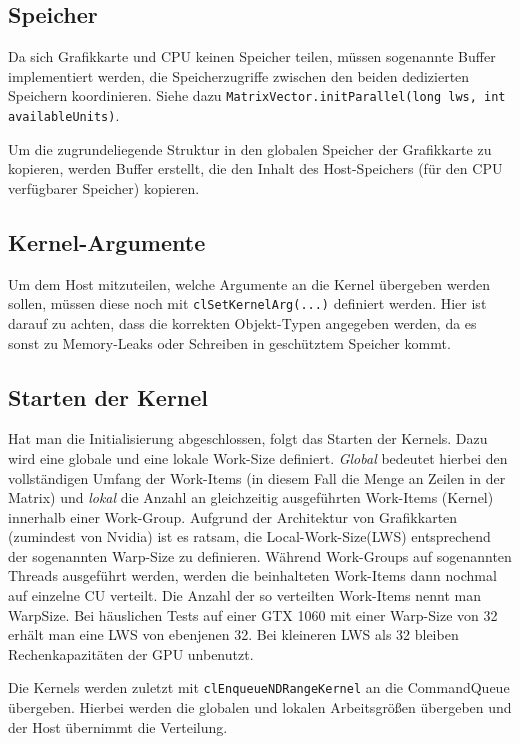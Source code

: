 \documentclass[
	ngerman,
	ruledheaders=section,
	class=report,
	thesis={type=Dokumentation},
	ignore-missing-data=true,
	accentcolor=9c,
	custommargins=false,
	marginpar=false,
	parskip=half-,
	fontsize=11pt,
]{tudapub}
\let\code\texttt
\def\code#1{\texttt{#1}}
\begin{document}
\subsection{Speicher}
Da sich Grafikkarte und CPU keinen Speicher teilen, müssen sogenannte Buffer implementiert werden, die Speicherzugriffe zwischen den beiden dedizierten Speichern koordinieren. Siehe dazu \code{MatrixVector.initParallel(long lws, int availableUnits)}.

Um die zugrundeliegende Struktur in den globalen Speicher der Grafikkarte zu kopieren, werden Buffer erstellt, die den Inhalt des Host-Speichers (für den CPU verfügbarer Speicher) kopieren.

\subsection{Kernel-Argumente}
Um dem Host mitzuteilen, welche Argumente an die Kernel übergeben werden sollen, müssen diese noch mit \code{clSetKernelArg(...)} definiert werden. Hier ist darauf zu achten, dass die korrekten Objekt-Typen angegeben werden, da es sonst zu Memory-Leaks oder Schreiben in geschütztem Speicher kommt.

\subsection{Starten der Kernel}
Hat man die Initialisierung abgeschlossen, folgt das Starten der Kernels. Dazu wird eine globale und eine lokale Work-Size definiert. \textit{Global} bedeutet hierbei den vollständigen Umfang der Work-Items (in diesem Fall die Menge an Zeilen in der Matrix) und \textit{lokal} die Anzahl an gleichzeitig ausgeführten Work-Items (Kernel) innerhalb einer Work-Group. Aufgrund der Architektur von Grafikkarten (zumindest von Nvidia) ist es ratsam, die Local-Work-Size(LWS) entsprechend der sogenannten Warp-Size zu definieren. Während Work-Groups auf sogenannten Threads ausgeführt werden, werden die beinhalteten Work-Items dann nochmal auf einzelne CU verteilt. Die Anzahl der so verteilten Work-Items nennt man WarpSize. Bei häuslichen Tests auf einer GTX 1060 mit einer Warp-Size von 32 erhält man eine LWS von ebenjenen 32. Bei kleineren LWS als 32 bleiben Rechenkapazitäten der GPU unbenutzt.

Die Kernels werden zuletzt mit \code{clEnqueueNDRangeKernel} an die CommandQueue übergeben. Hierbei werden die globalen und lokalen Arbeitsgrößen übergeben und der Host übernimmt die Verteilung.
\end{document}
